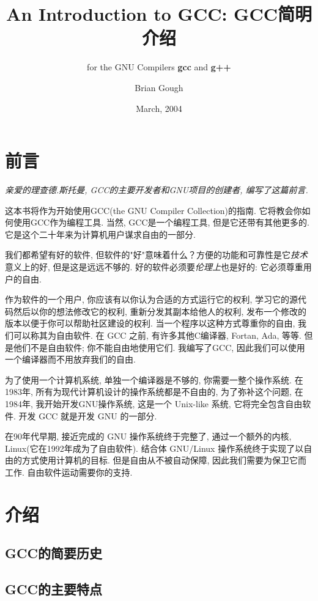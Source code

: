 \documentclass[lang=cn,12pt,newtx,scheme=chinese]{elegantbook}
\title{An Introduction to GCC: GCC简明介绍}
\subtitle{for the GNU Compilers \textbf{gcc} and \textbf{g++}}
\author{Brian Gough}
\date{March, 2004}
\begin{document}
\maketitle
\frontmatter

\tableofcontents
\mainmatter

\chapter*{前言}
\textit{亲爱的理查德.斯托曼, GCC的主要开发者和GNU项目的创建者, 编写了这篇前言.}

\indent 这本书将作为开始使用GCC(the GNU Compiler Collection)的指南. 它将教会你如何使用GCC作为编程工具. 当然, GCC是一个编程工具, 但是它还带有其他更多的. 它是这个二十年来为计算机用户谋求自由的一部分.

\indent 我们都希望有好的软件, 但软件的"好"意味着什么？方便的功能和可靠性是它\textit{技术}意义上的好, 但是这是远远不够的. 好的软件必须要\textit{伦理上}也是好的: 它必须尊重用户的自由.

\indent 作为软件的一个用户, 你应该有以你认为合适的方式运行它的权利, 学习它的源代码然后以你的想法修改它的权利, 重新分发其副本给他人的权利, 发布一个修改的版本以便于你可以帮助社区建设的权利. 当一个程序以这种方式尊重你的自由, 我们可以称其为自由软件. 在 GCC 之前, 有许多其他C编译器, Fortan, Ada, 等等. 但是他们不是自由软件; 你不能自由地使用它们. 我编写了GCC, 因此我们可以使用一个编译器而不用放弃我们的自由.

\indent 为了使用一个计算机系统, 单独一个编译器是不够的, 你需要一整个操作系统. 在1983年, 所有为现代计算机设计的操作系统都是不自由的, 为了弥补这个问题, 在1984年, 我开始开发GNU操作系统, 这是一个 Unix-like 系统, 它将完全包含自由软件. 开发 GCC 就是开发 GNU 的一部分.

\indent 在90年代早期, 接近完成的 GNU 操作系统终于完整了, 通过一个额外的内核, Linux(它在1992年成为了自由软件). 结合体 GNU/Linux 操作系统终于实现了以自由的方式使用计算机的目标. 但是自由从不被自动保障, 因此我们需要为保卫它而工作. 自由软件运动需要你的支持.


\chapter{介绍}
\section{GCC的简要历史}
\section{GCC的主要特点}
\end{document}
